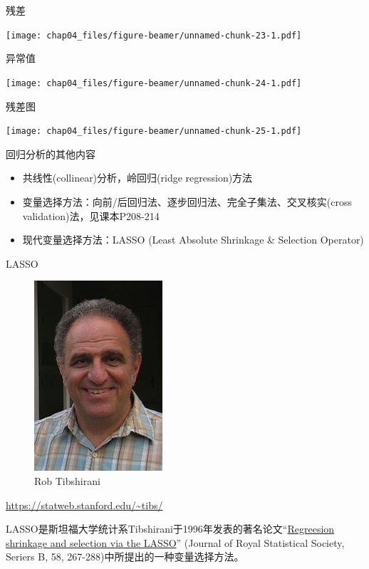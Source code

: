 \documentclass[ignorenonframetext,]{beamer}
\begin{document}
\begin{frame}{残差}

\texttt{[image: chap04\_files/figure-beamer/unnamed-chunk-23-1.pdf]}

\end{frame}

\begin{frame}{异常值}

\texttt{[image: chap04\_files/figure-beamer/unnamed-chunk-24-1.pdf]}

\end{frame}

\begin{frame}{残差图}
\protect\hypertarget{-1}{}

\texttt{[image: chap04\_files/figure-beamer/unnamed-chunk-25-1.pdf]}

\end{frame}

\begin{frame}{回归分析的其他内容}

\begin{itemize}
\item
  共线性(collinear)分析，岭回归(ridge regression)方法
\item
  变量选择方法：向前/后回归法、逐步回归法、完全子集法、交叉核实(cross
  validation)法，见课本P208-214
\item
  现代变量选择方法：LASSO (Least Absolute Shrinkage \& Selection
  Operator)
\end{itemize}

\end{frame}

\begin{frame}{LASSO}
\protect\hypertarget{lasso}{}

\begin{figure}
\includegraphics[width=0.25\linewidth]{rob} \caption{Rob Tibshirani}\label{fig:unnamed-chunk-26}
\end{figure}

\url{https://statweb.stanford.edu/~tibs/}

LASSO是斯坦福大学统计系Tibshirani于1996年发表的著名论文``\href{http://statweb.stanford.edu/~tibs/lasso/lasso.pdf}{Regreesion
shrinkage and selection via the LASSO}'' (Journal of Royal Statistical
Society, Seriers B, 58, 267-288)中所提出的一种变量选择方法。

\end{frame}
\end{document}
